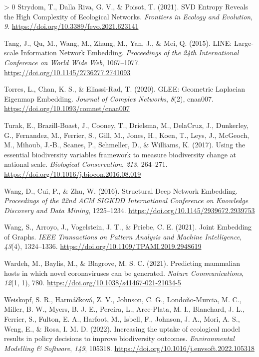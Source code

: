 \documentclass[11pt]{article}
\newlength{\cslhangindent}
\newenvironment{CSLReferences}[3] %
 {%
  \setlength{\parindent}{0pt}
  \ifodd #1 \everypar{\setlength{\hangindent}{\cslhangindent}}\ignorespaces\fi
  \ifnum #2 > 0
  \setlength{\parskip}{#2\baselineskip}
  \fi
 }%
 {}
\begin{document}
\begin{CSLReferences}{1}{0}
\leavevmode\hypertarget{ref-Strydom2021SvdEnt}{}%
Strydom, T., Dalla Riva, G. V., \& Poisot, T. (2021). SVD Entropy
Reveals the High Complexity of Ecological Networks. \emph{Frontiers in
Ecology and Evolution}, \emph{9}.
\url{https://doi.org/10.3389/fevo.2021.623141}

\leavevmode\hypertarget{ref-Tang2015LinLar}{}%
Tang, J., Qu, M., Wang, M., Zhang, M., Yan, J., \& Mei, Q. (2015). LINE:
Large-scale Information Network Embedding. \emph{Proceedings of the 24th
International Conference on World Wide Web}, 1067--1077.
\url{https://doi.org/10.1145/2736277.2741093}

\leavevmode\hypertarget{ref-Torres2020GleGeo}{}%
Torres, L., Chan, K. S., \& Eliassi-Rad, T. (2020). GLEE: Geometric
Laplacian Eigenmap Embedding. \emph{Journal of Complex Networks},
\emph{8}(2), cnaa007. \url{https://doi.org/10.1093/comnet/cnaa007}

\leavevmode\hypertarget{ref-Turak2017UsiEss}{}%
Turak, E., Brazill-Boast, J., Cooney, T., Drielsma, M., DelaCruz, J.,
Dunkerley, G., Fernandez, M., Ferrier, S., Gill, M., Jones, H., Koen,
T., Leys, J., McGeoch, M., Mihoub, J.-B., Scanes, P., Schmeller, D., \&
Williams, K. (2017). Using the essential biodiversity variables
framework to measure biodiversity change at national scale.
\emph{Biological Conservation}, \emph{213}, 264--271.
\url{https://doi.org/10.1016/j.biocon.2016.08.019}

\leavevmode\hypertarget{ref-Wang2016StrDee}{}%
Wang, D., Cui, P., \& Zhu, W. (2016). Structural Deep Network Embedding.
\emph{Proceedings of the 22nd ACM SIGKDD International Conference on
Knowledge Discovery and Data Mining}, 1225--1234.
\url{https://doi.org/10.1145/2939672.2939753}

\leavevmode\hypertarget{ref-Wang2021JoiEmb}{}%
Wang, S., Arroyo, J., Vogelstein, J. T., \& Priebe, C. E. (2021). Joint
Embedding of Graphs. \emph{IEEE Transactions on Pattern Analysis and
Machine Intelligence}, \emph{43}(4), 1324--1336.
\url{https://doi.org/10.1109/TPAMI.2019.2948619}

\leavevmode\hypertarget{ref-Wardeh2021PreMam}{}%
Wardeh, M., Baylis, M., \& Blagrove, M. S. C. (2021). Predicting
mammalian hosts in which novel coronaviruses can be generated.
\emph{Nature Communications}, \emph{12}(1, 1), 780.
\url{https://doi.org/10.1038/s41467-021-21034-5}

\leavevmode\hypertarget{ref-Weiskopf2022IncUpt}{}%
Weiskopf, S. R., Harmáčková, Z. V., Johnson, C. G., Londoño-Murcia, M.
C., Miller, B. W., Myers, B. J. E., Pereira, L., Arce-Plata, M. I.,
Blanchard, J. L., Ferrier, S., Fulton, E. A., Harfoot, M., Isbell, F.,
Johnson, J. A., Mori, A. S., Weng, E., \& Rosa, I. M. D. (2022).
Increasing the uptake of ecological model results in policy decisions to
improve biodiversity outcomes. \emph{Environmental Modelling \&
Software}, \emph{149}, 105318.
\url{https://doi.org/10.1016/j.envsoft.2022.105318}


\end{CSLReferences}
\end{document}
